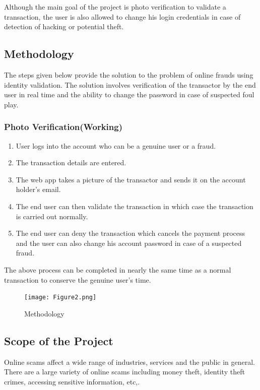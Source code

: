 \documentclass[12pt, oneside, a4paper]{article}
\begin{document}
\vspace{1cm}
Although the main goal of the project is photo verification to validate a transaction, the user is also allowed to change his login credentials in case of detection of hacking or potential theft.

\pagebreak

\subsection{Methodology}
The steps given below provide the solution to the problem of online frauds using identity validation. The solution involves verification of the transactor by the end user in real time and the ability to change the password in case of suspected foul play.
\subsubsection{Photo Verification(Working)}
\begin{enumerate}
    \itemsep0em
    \item User logs into the account who can be a genuine user or a fraud.
    \item The transaction details are entered.
    \item The web app takes a picture of the transactor and sends it on the account holder's email.
    \item The end user can then validate the transaction in which case the transaction is carried out normally.
    \item The end user can deny the transaction which cancels the payment process and the user can also change his account password in case of a suspected fraud.
\end{enumerate}

The above process can be completed in nearly the same time as a normal transaction to conserve the genuine user's time.
\vspace{1.5cm}

\begin{figure}[H]
\begin{center}
\texttt{[image: Figure2.png]}\\
\caption{Methodology}
\label{fig:Figure 2}
\end{center}
\end{figure}



\pagebreak

\subsection{Scope of the Project}
Online scams affect a wide range of industries, services and the public in general. There are a large variety of online scams including money theft, identity theft crimes, accessing sensitive information, etc,. 
\end{document}
